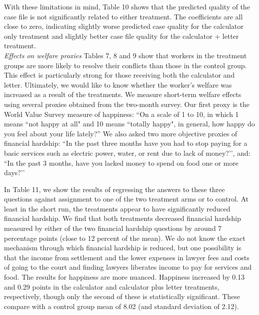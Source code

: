 \documentclass[12 pt]{article}
\begin{document}
With these limitations in mind, Table 10 shows that the predicted quality of the case file is not significantly related to either treatment. The coefficients are all close to zero, indicating slightly worse predicted case quality for the calculator only treatment and slightly better case file quality for the calculator + letter treatment.
\\

\noindent\emph{Effects on welfare proxies}
Tables 7, 8 and 9 show that workers in the treatment groups are more likely to resolve their conflicts than those in the control group. This effect is particularly strong for those receiving both the calculator and letter. Ultimately, we would like to know whether the worker’s welfare was increased as a result of the treatments. We measure short-term welfare effects using several proxies obtained from the two-month survey. Our first proxy is the World Value Survey measure of happiness: “On a scale of 1 to 10, in which 1 means “not happy at all" and 10 means “totally happy", in general, how happy do you feel about your life lately?” We also asked two more objective proxies of financial hardship: “In the past three months have you had to stop paying for a basic services such as electric power, water, or rent due to lack of money?’’, and: “In the past 3 months, have you lacked money to spend on food one or more days?’’ 

In Table 11, we show the results of regressing the answers to these three questions against assignment to one of the two treatment arms or to control. At least in the short run, the treatments appear to have significantly reduced financial hardship. We find that both treatments decreased financial hardship measured by either of the two financial hardship questions by around 7 percentage points (close to 12 percent of the mean). We do not know the exact mechanism through which financial hardship is reduced, but one possibility is that the income from settlement and the lower expenses in lawyer fees and costs of going to the court and finding lawyers liberates income to pay for services and food. The results for happiness are more nuanced. Happiness increased by 0.13 and 0.29 points in the calculator and calculator plus letter treatments, respectively, though only the second of these is statistically significant. These compare with a control group mean of 8.02 (and standard deviation of 2.12). 
\end{document}

